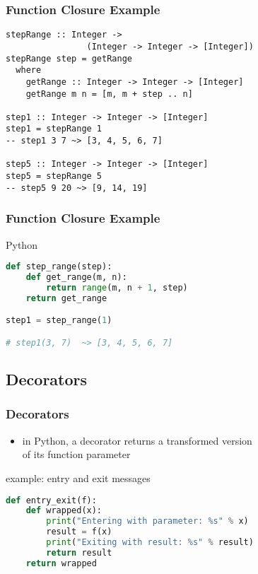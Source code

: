 \documentclass[dvipsnames]{beamer}
\theoremstyle{plain}
\begin{document}
\begin{frame}[fragile]
  \frametitle{Function Closure Example}

  \begin{exampleblock}{}
    \begin{lstlisting}
stepRange :: Integer ->
                (Integer -> Integer -> [Integer])
stepRange step = getRange
  where
    getRange :: Integer -> Integer -> [Integer]
    getRange m n = [m, m + step .. n]

step1 :: Integer -> Integer -> [Integer]
step1 = stepRange 1
-- step1 3 7 ~> [3, 4, 5, 6, 7]

step5 :: Integer -> Integer -> [Integer]
step5 = stepRange 5
-- step5 9 20 ~> [9, 14, 19]
    \end{lstlisting}
  \end{exampleblock}
\end{frame}

\begin{frame}[fragile]
  \frametitle{Function Closure Example}

  \begin{exampleblock}{Python}
    \begin{lstlisting}[language=Python]
def step_range(step):
    def get_range(m, n):
        return range(m, n + 1, step)
    return get_range

step1 = step_range(1)

# step1(3, 7)  ~> [3, 4, 5, 6, 7]
    \end{lstlisting}
  \end{exampleblock}
\end{frame}

\subsection{Decorators}

\begin{frame}[fragile]
  \frametitle{Decorators}

  \begin{itemize}
    \item in Python, a decorator returns a transformed version\\
      of its function parameter
  \end{itemize}

  \begin{exampleblock}{example: entry and exit messages}
    \begin{lstlisting}[language=Python]
def entry_exit(f):
    def wrapped(x):
        print("Entering with parameter: %s" % x)
        result = f(x)
        print("Exiting with result: %s" % result)
        return result
    return wrapped
    \end{lstlisting}
  \end{exampleblock}
\end{frame}
\end{document}
